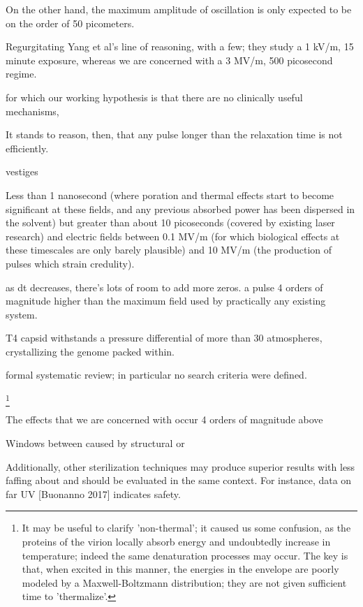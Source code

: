 \documentclass[paper.tex]{subfiles}
\begin{document}
\begin{multicols}{1}
On the other hand, the maximum amplitude of oscillation is only expected to be on the order of 50 picometers. 


Regurgitating Yang et al's line of reasoning, with a few; they study a 1 kV/m, 15 minute exposure, whereas we are concerned with a 3 MV/m, 500 picosecond regime. 


for which our working hypothesis is that there are no clinically useful mechanisms, 



It stands to reason, then, that any pulse longer than the relaxation time is not efficiently. 

vestiges

Less than 1 nanosecond (where poration and thermal effects start to become significant at these fields, and any previous absorbed power has been dispersed in the solvent) but greater than about 10 picoseconds (covered by existing laser research) and electric fields between 0.1 MV/m (for which biological effects at these timescales are only barely plausible) and 10 MV/m (the production of pulses which strain credulity).

as dt decreases, there's lots of room to add more zeros. a pulse 4 orders of magnitude higher than the maximum field used by practically any existing system.





T4 capsid withstands a pressure differential of more than 30 atmospheres, crystallizing the genome packed within. \cite{Osmotic2003}


formal systematic review; in particular no search criteria were defined.

%
\footnote{It may be useful to clarify 'non-thermal'; it caused us some confusion, as the proteins of the virion locally absorb energy and undoubtedly increase in temperature; indeed the same denaturation processes may occur. The key is that, when excited in this manner, the energies in the envelope are poorly modeled by a Maxwell-Boltzmann distribution; they are not given sufficient time to 'thermalize'.} 
%


The effects that we are concerned with occur 4 orders of magnitude above 

Windows between caused by structural or 

Additionally, other sterilization techniques may produce superior results with less faffing about and should be evaluated in the same context. For instance, data on far UV [Buonanno 2017] indicates safety.\\


\end{multicols}
\end{document}
